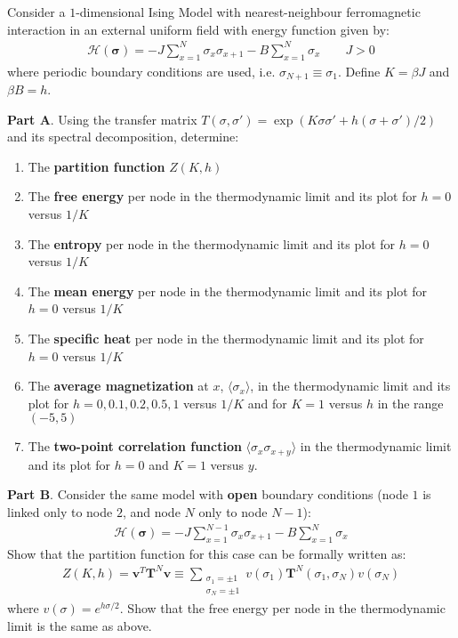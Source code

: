 \documentclass[../../main.tex]{subfiles}
\begin{document}
\begin{exo}
    Consider a $1$-dimensional Ising Model with nearest-neighbour ferromagnetic interaction in an external uniform field with energy function given by:
    \begin{align*}
        \mathcal{H}(\bm{\sigma}) = -J \sum_{x=1}^N \sigma_x \sigma_{x+1} - B \sum_{x=1}^N \sigma_x \qquad J > 0
    \end{align*}    
    where periodic boundary conditions are used, i.e. $\sigma_{N+1} \equiv \sigma_1$. Define $K = \beta J$ and $\beta B = h$.
    
    \medskip
    
    \textbf{Part A}. Using the transfer matrix $T(\sigma, \sigma') = \exp(K \sigma \sigma' + h (\sigma + \sigma')/2)$ and its spectral decomposition, determine:
    \begin{enumerate}
        \item The \textbf{partition function} $Z(K,h)$
        \item The \textbf{free energy} per node in the thermodynamic limit and its plot for $h=0$ versus $1/K$
        \item The \textbf{entropy} per node in the thermodynamic limit and its plot for $h=0$ versus $1/K$
        \item The \textbf{mean energy} per node in the thermodynamic limit and its plot for $h=0$ versus $1/K$
        \item The \textbf{specific heat} per node in the thermodynamic limit and its plot for $h=0$ versus $1/K$
        \item The \textbf{average magnetization} at $x$, $\langle \sigma_x \rangle$, in the thermodynamic limit and its plot for $h=0, 0.1, 0.2, 0.5, 1$ versus $1/K$ and for $K=1$ versus $h$ in the range $(-5,5)$
        \item The \textbf{two-point correlation function} $\langle \sigma_x \sigma_{x+y} \rangle$ in the thermodynamic limit and its plot for $h=0$ and $K=1$ versus $y$.
    \end{enumerate}

    \textbf{Part B}. Consider the same model with \textbf{open} boundary conditions (node $1$ is linked only to node $2$, and node $N$ only to node $N-1$):
    \begin{align*}
        \mathcal{H}(\bm{\sigma}) = -J \sum_{x=1}^{N-1} \sigma_x \sigma_{x+1} - B \sum_{x=1}^N \sigma_x
    \end{align*}   
    Show that the partition function for this case can be formally written as:
    \begin{align*}
        Z(K,h) = \bm{v}^T \textbf{T}^N \bm{v} \equiv \sum_{\substack{\sigma_1 = \pm 1\\ \sigma_N = \pm 1}} v(\sigma_1) \textbf{T}^N(\sigma_1, \sigma_N) v(\sigma_N)  
    \end{align*}
    where $v(\sigma) = e^{h \sigma /2}$. Show that the free energy per node in the thermodynamic limit is the same as above.
    

\end{exo}
\end{document}
